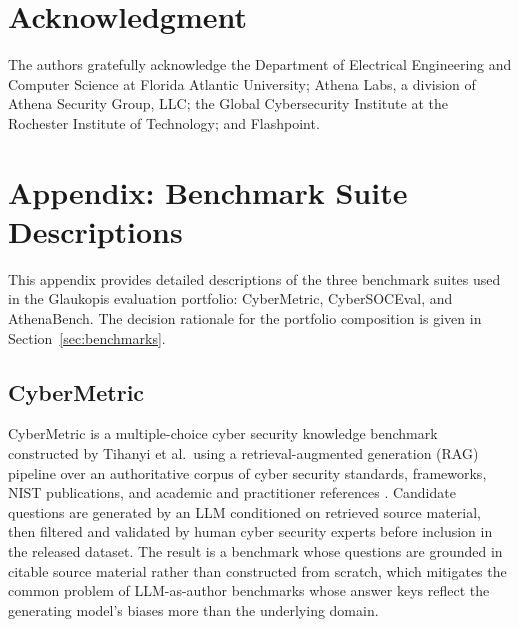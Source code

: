 \documentclass[conference]{IEEEtran}
\begin{document}
\section*{Acknowledgment}
The authors gratefully acknowledge the Department of Electrical Engineering and Computer Science at Florida Atlantic University; Athena Labs, a division of Athena Security Group, LLC; the Global Cybersecurity Institute at the Rochester Institute of Technology; and Flashpoint.



\setcounter{section}{0}
\renewcommand{\thesection}{\Alph{section}}
\section{Appendix: Benchmark Suite Descriptions}
\label{app:benchmarks}

This appendix provides detailed descriptions of the three benchmark suites used in the Glaukopis evaluation portfolio: CyberMetric, CyberSOCEval, and AthenaBench. The decision rationale for the portfolio composition is given in Section~\ref{sec:benchmarks}.

\subsection{CyberMetric}
\label{sec:cybermetric}

CyberMetric is a multiple-choice cyber security knowledge benchmark constructed by Tihanyi et al.\ using a retrieval-augmented generation (RAG) pipeline over an authoritative corpus of cyber security standards, frameworks, NIST publications, and academic and practitioner references \cite{tihanyi2024cybermetric}. Candidate questions are generated by an LLM conditioned on retrieved source material, then filtered and validated by human cyber security experts before inclusion in the released dataset. The result is a benchmark whose questions are grounded in citable source material rather than constructed from scratch, which mitigates the common problem of LLM-as-author benchmarks whose answer keys reflect the generating model's biases more than the underlying domain.
\end{document}
